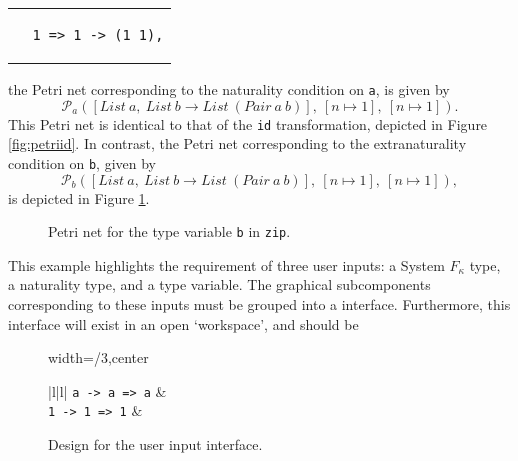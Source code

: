 \documentclass[../Dissertation.tex]{subfiles}
\begin{document}
\begin{center}
\begin{tabular}{c}
\begin{lstlisting}
  1 => 1 -> (1 1),
\end{lstlisting}
\end{tabular}
\end{center}
the Petri net corresponding to the naturality condition on \lstinline{a}, is given by
\begin{equation*}
  \mathcal{P}_a([List\ a,\ List\ b \rightarrow List\ (Pair\ a\ b)],\ [n \mapsto 1],\ [n \mapsto 1]).
\end{equation*}
This Petri net is identical to that of the \lstinline{id} transformation, depicted in Figure \ref{fig:petriid}. In contrast, the Petri net corresponding to the extranaturality condition on \lstinline{b}, given by
\begin{equation*}
  \mathcal{P}_b([List\ a,\ List\ b \rightarrow List\ (Pair\ a\ b)],\ [n \mapsto 1],\ [n \mapsto 1]),
\end{equation*}
is depicted in Figure \ref{fig:petrizipb}.
 
\begin{figure}[H]
  \begin{center}
  \end{center}
  \caption{Petri net for the type variable \lstinline{b} in \lstinline{zip}.}
  \label{fig:petrizipb}
\end{figure}
This example highlights the requirement of three user inputs: a System $F_\kappa$ type, a naturality type, and a type variable. The graphical subcomponents corresponding to these inputs must be grouped into a interface. Furthermore, this interface will exist in an open `workspace', and should be 

\begin{figure}[H]
\begin{adjustbox}{width=\columnwidth/3,center}
\centering
\begin{tabu}{|l|l|}
\lstinline{a -> a => a} &  \\ 
\lstinline{1 -> 1 => 1} &  \\ \hline
\end{tabu}
\end{adjustbox}
\caption{Design for the user input interface.}
\label{fig:petriidconcat}
\end{figure}
\end{document}
